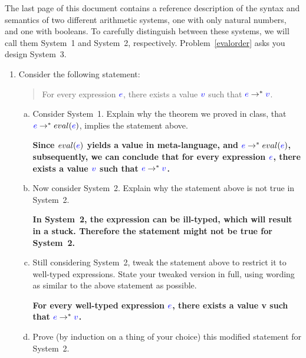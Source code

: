 \documentclass{article}
\newcommand{\meta}[1]{{\color{blue}#1}}
\begin{document}
\noindent The last page of this document contains a reference description of the syntax and semantics of
two different arithmetic systems, one with only natural numbers, and one with booleans.
To carefully distinguish between these systems, we will call them System~1 and System~2, respectively.
Problem~\ref{evalorder} asks you design System~3.

\begin{enumerate}[leftmargin=*,itemindent=*,start=6,label={{\bf Problem \arabic*}.},ref=\arabic*]
\item
  Consider the following statement:
  \begin{quote}
    For every expression $\meta{e}$, there exists a value $\meta{v}$ such that $\meta{e} \to^* \meta{v}$.
  \end{quote}
  \begin{enumerate}[(a)]
  \item Consider System~1. Explain why the theorem we proved in class, that $\meta{e} \to^* eval(\meta{e})$,
    implies the statement above.

    \textbf{Since $eval(\meta{e})$ yields a value in meta-language, and $\meta{e} \to^* eval(\meta{e})$, subsequently, we can conclude that for every expression $\meta{e}$, there exists a value $\meta{v}$ such that $\meta{e} \to^* \meta{v}$.}

  \item Now consider System~2. Explain why the statement above is not true in System~2.
  
    \textbf{In System~2, the expression can be ill-typed, which will result in a stuck. Therefore the statement might not be true for System~2.}

  \item \label{sys2stmt} Still considering System~2, tweak the statement above to restrict it to well-typed expressions.
    State your tweaked version in full, using wording as similar to the above statement as possible.

    \textbf{For every well-typed expression $\meta{e}$, there exists a value \meta{v} such that $\meta{e} \to^* \meta{v}$.}

  \item \label{sys2pf} Prove (by induction on a thing of your choice) this modified statement for System~2.
    

\end{enumerate}
\end{enumerate}
\end{document}
